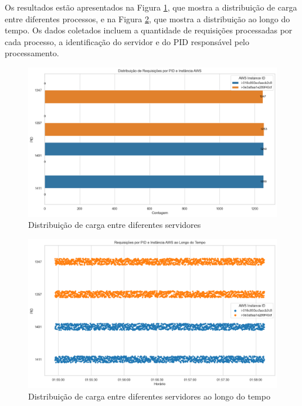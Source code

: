 Os resultados estão apresentados na Figura \ref{fig:reqs-per-pid}, que mostra a distribuição de carga entre diferentes processos, e na Figura \ref{fig:reqs-per-pid-over-time}, que mostra a distribuição ao longo do tempo. Os dados coletados incluem a quantidade de requisições processadas por cada processo, a identificação do servidor e do PID responsável pelo processamento.


\begin{figure}[H]
    \centering
    \includegraphics[width=1\textwidth]{assets/balance-test/reqs-per-pid.png}
    \caption{Distribuição de carga entre diferentes servidores}
    \label{fig:reqs-per-pid}
\end{figure}

\begin{figure}[H]
    \centering
    \includegraphics[width=1\textwidth]{assets/balance-test/reqs-per-pid-over-time.png}
    \caption{Distribuição de carga entre diferentes servidores ao longo do tempo}
    \label{fig:reqs-per-pid-over-time}
\end{figure}

